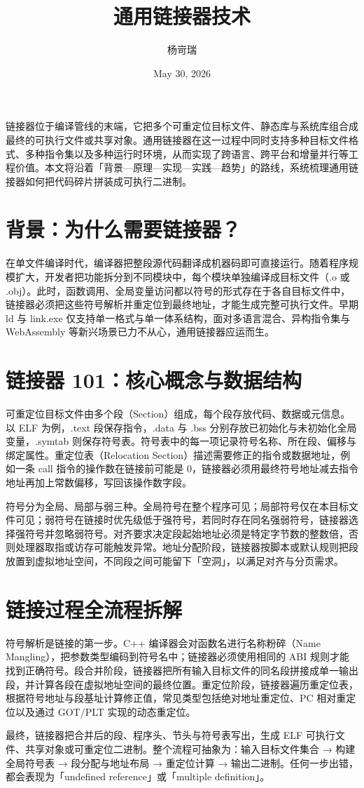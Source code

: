 \title{通用链接器技术}
\author{杨岢瑞}
\date{May 30, 2026}
\maketitle
链接器位于编译管线的末端，它把多个可重定位目标文件、静态库与系统库组合成最终的可执行文件或共享对象。通用链接器在这一过程中同时支持多种目标文件格式、多种指令集以及多种运行时环境，从而实现了跨语言、跨平台和增量并行等工程价值。本文将沿着「背景—原理—实现—实践—趋势」的路线，系统梳理通用链接器如何把代码碎片拼装成可执行二进制。\par
\chapter{背景：为什么需要链接器？}
在单文件编译时代，编译器把整段源代码翻译成机器码即可直接运行。随着程序规模扩大，开发者把功能拆分到不同模块中，每个模块单独编译成目标文件（.o 或 .obj）。此时，函数调用、全局变量访问都以符号的形式存在于各自目标文件中，链接器必须把这些符号解析并重定位到最终地址，才能生成完整可执行文件。早期 ld 与 link.exe 仅支持单一格式与单一体系结构，面对多语言混合、异构指令集与 WebAssembly 等新兴场景已力不从心，通用链接器应运而生。\par
\chapter{链接器 101：核心概念与数据结构}
可重定位目标文件由多个段（Section）组成，每个段存放代码、数据或元信息。以 ELF 为例，.text 段保存指令，.data 与 .bss 分别存放已初始化与未初始化全局变量，.symtab 则保存符号表。符号表中的每一项记录符号名称、所在段、偏移与绑定属性。重定位表（Relocation Section）描述需要修正的指令或数据地址，例如一条 call 指令的操作数在链接前可能是 0，链接器必须用最终符号地址减去指令地址再加上常数偏移，写回该操作数字段。\par
符号分为全局、局部与弱三种。全局符号在整个程序可见；局部符号仅在本目标文件可见；弱符号在链接时优先级低于强符号，若同时存在同名强弱符号，链接器选择强符号并忽略弱符号。对齐要求决定段起始地址必须是特定字节数的整数倍，否则处理器取指或访存可能触发异常。地址分配阶段，链接器按脚本或默认规则把段放置到虚拟地址空间，不同段之间可能留下「空洞」，以满足对齐与分页需求。\par
\chapter{链接过程全流程拆解}
符号解析是链接的第一步。C++ 编译器会对函数名进行名称粉碎（Name Mangling），把参数类型编码到符号名中；链接器必须使用相同的 ABI 规则才能找到正确符号。段合并阶段，链接器把所有输入目标文件的同名段拼接成单一输出段，并计算各段在虚拟地址空间的最终位置。重定位阶段，链接器遍历重定位表，根据符号地址与段基址计算修正值，常见类型包括绝对地址重定位、PC 相对重定位以及通过 GOT/PLT 实现的动态重定位。\par
最终，链接器把合并后的段、程序头、节头与符号表写出，生成 ELF 可执行文件、共享对象或可重定位二进制。整个流程可抽象为：输入目标文件集合 → 构建全局符号表 → 段分配与地址布局 → 重定位计算 → 输出二进制。任何一步出错，都会表现为「undefined reference」或「multiple definition」。\par
